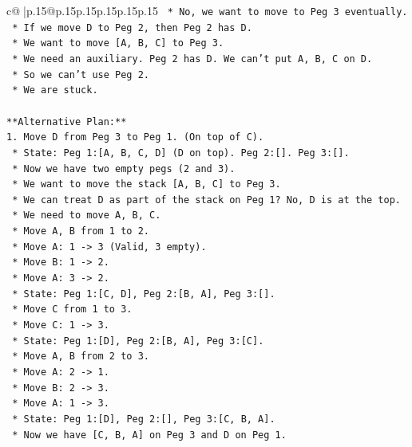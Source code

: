 \documentclass{article}
\begin{document}
{\begin{supertabular}{c@{$\;$}|p{.15\linewidth}@{}p{.15\linewidth}p{.15\linewidth}p{.15\linewidth}p{.15\linewidth}p{.15\linewidth}}
{{{\texttt{    *   No, we want to move to Peg 3 eventually.} \\
\texttt{    *   If we move D to Peg 2, then Peg 2 has D.} \\
\texttt{    *   We want to move {[}A, B, C{]} to Peg 3.} \\
\texttt{    *   We need an auxiliary. Peg 2 has D. We can't put A, B, C on D.} \\
\texttt{    *   So we can't use Peg 2.} \\
\texttt{    *   We are stuck.} \\
\\ 
\texttt{**Alternative Plan:**} \\
\texttt{1.  Move D from Peg 3 to Peg 1. (On top of C).} \\
\texttt{    *   State: Peg 1:{[}A, B, C, D{]} (D on top). Peg 2:{[}{]}. Peg 3:{[}{]}.} \\
\texttt{    *   Now we have two empty pegs (2 and 3).} \\
\texttt{    *   We want to move the stack {[}A, B, C{]} to Peg 3.} \\
\texttt{    *   We can treat D as part of the stack on Peg 1? No, D is at the top.} \\
\texttt{    *   We need to move A, B, C.} \\
\texttt{    *   Move A, B from 1 to 2.} \\
\texttt{        *   Move A: 1 {-}> 3 (Valid, 3 empty).} \\
\texttt{        *   Move B: 1 {-}> 2.} \\
\texttt{        *   Move A: 3 {-}> 2.} \\
\texttt{        *   State: Peg 1:{[}C, D{]}, Peg 2:{[}B, A{]}, Peg 3:{[}{]}.} \\
\texttt{    *   Move C from 1 to 3.} \\
\texttt{        *   Move C: 1 {-}> 3.} \\
\texttt{        *   State: Peg 1:{[}D{]}, Peg 2:{[}B, A{]}, Peg 3:{[}C{]}.} \\
\texttt{    *   Move A, B from 2 to 3.} \\
\texttt{        *   Move A: 2 {-}> 1.} \\
\texttt{        *   Move B: 2 {-}> 3.} \\
\texttt{        *   Move A: 1 {-}> 3.} \\
\texttt{        *   State: Peg 1:{[}D{]}, Peg 2:{[}{]}, Peg 3:{[}C, B, A{]}.} \\
\texttt{    *   Now we have {[}C, B, A{]} on Peg 3 and D on Peg 1.} \\
}}}
\end{supertabular}}
\end{document}
